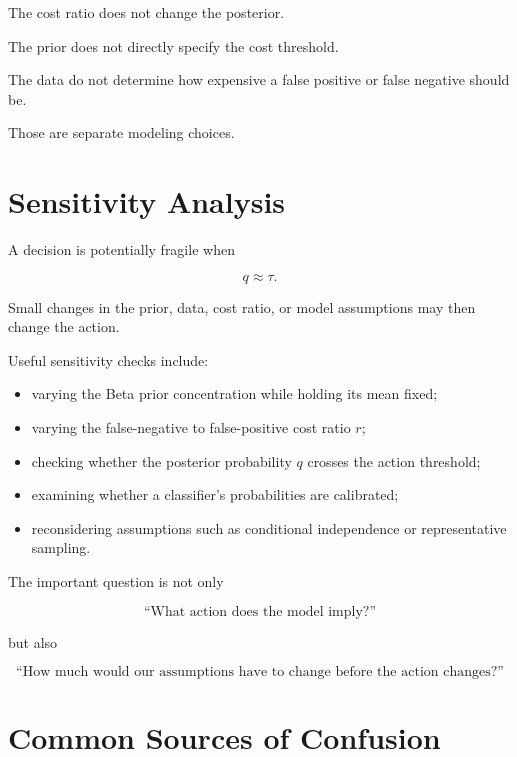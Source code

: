 \documentclass[11pt]{article}
\begin{document}
The cost ratio does not change the posterior.

The prior does not directly specify the cost threshold.

The data do not determine how expensive a false positive or false negative should be.

Those are separate modeling choices.

\section{Sensitivity Analysis}

A decision is potentially fragile when

\[
q\approx\tau.
\]

Small changes in the prior, data, cost ratio, or model assumptions may then change the action.

Useful sensitivity checks include:

\begin{itemize}
    \item varying the Beta prior concentration while holding its mean fixed;
    \item varying the false-negative to false-positive cost ratio $r$;
    \item checking whether the posterior probability $q$ crosses the action threshold;
    \item examining whether a classifier's probabilities are calibrated;
    \item reconsidering assumptions such as conditional independence or representative sampling.
\end{itemize}

The important question is not only

\[
\text{``What action does the model imply?''}
\]

but also

\[
\text{``How much would our assumptions have to change before the action changes?''}
\]

\section{Common Sources of Confusion}
\end{document}
